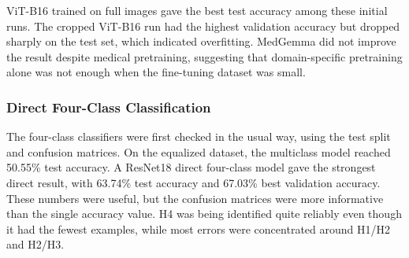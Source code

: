\documentclass[twocolumn,10pt]{article}
\begin{document}
\begin{table}[H]
\centering
{}
\caption{Earlier Heckmatt grading results across backbone architectures}
\label{tab:heckmatt_old_results}
\end{table}

ViT-B16 trained on full images gave the best test accuracy among these initial runs. The cropped ViT-B16 run had the highest validation accuracy but dropped sharply on the test set, which indicated overfitting. MedGemma did not improve the result despite medical pretraining, suggesting that domain-specific pretraining alone was not enough when the fine-tuning dataset was small.

\subsubsection{Direct Four-Class Classification}
The four-class classifiers were first checked in the usual way, using the test split and confusion matrices. On the equalized dataset, the multiclass model reached 50.55\% test accuracy. A ResNet18 direct four-class model gave the strongest direct result, with 63.74\% test accuracy and 67.03\% best validation accuracy. These numbers were useful, but the confusion matrices were more informative than the single accuracy value. H4 was being identified quite reliably even though it had the fewest examples, while most errors were concentrated around H1/H2 and H2/H3.

\begin{table}[H]
\centering
{}
\caption{Direct multiclass classification results}
\label{tab:direct_multiclass}
\end{table}
\end{document}

